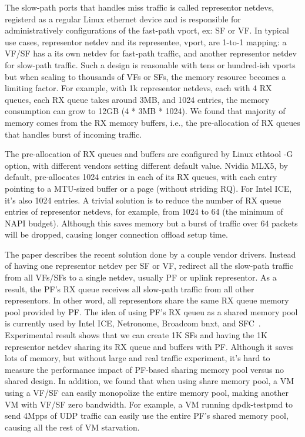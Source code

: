 \documentclass[letterpaper]{article}
\begin{document}
The slow-path ports that handles miss traffic is called representor
netdevs, registerd as a regular Linux ethernet device and is responsible
for administratively configurations of the fast-path vport, ex: SF or VF.
In typical use cases, representor netdev and its representee, vport,
are 1-to-1 mapping: a VF/SF has a its own netdev for fast-path traffic,
and another representor netdev for slow-path traffic.
Such a design is reasonable with tens or hundred-ish vports but when scaling
to thousands of VFs or SFs, the memory resource becomes a limiting factor.
For example, with 1k representor netdevs, each with 4 RX queues, each RX
queue takes around 3MB, and 1024 entries, the memory consumption can grow
to 12GB (4 * 3MB * 1024). We found that majority of memory comes from
the RX memory buffers, i.e., the pre-allocation of RX queues that handles
burst of incoming traffic.

The pre-allocation of RX queues and buffers are configured by Linux
ethtool -G option, with different vendors setting different default
value. Nvidia MLX5, by default, pre-allocates 1024 entries in each of
its RX queues, with each entry pointing to a MTU-sized buffer or a page
(without striding RQ). For Intel ICE, it's also 1024 entries. %
A trivial solution is to reduce the number of RX queue entries of
representor netdevs, for example, from 1024 to 64 (the minimum of NAPI
budget). Although this saves memory but a burst of traffic over 64 packets
will be dropped, causing longer connection offload setup time.

The paper describes the recent solution done by a couple vendor drivers.
Instead of having one representor netdev per SF or VF, redirect all
the slow-path traffic from all VFs/SFs to a single netdev, usually PF or
uplink representor. As a result, the PF's RX queue receives all slow-path
traffic from all other representors. In other word, all representors
share the same RX queue memory pool provided by PF. The idea of using PF's
RX qeueu as a shared memory pool is currently used by Intel ICE, Netronome,
Broadcom bnxt, and SFC~\cite{duedeli}.
Experimental result shows that we can create 1K SFs and having the 1K
representor netdev sharing its RX queue and buffers with PF. Although
it saves lots of memory, but without large and real traffic experiment,
it's hard to measure the performance impact of PF-based sharing memory
pool versus no shared design. In addition, we found that when using share
memory pool, a VM using a VF/SF can easily monopolize the entire memory
pool, making another VM with VF/SF zero bandwidth. For example, a VM
running dpdk-testpmd to send 4Mpps of UDP traffic can easily use the
entire PF's shared memory pool, causing all the rest of VM starvation.
\end{document}
